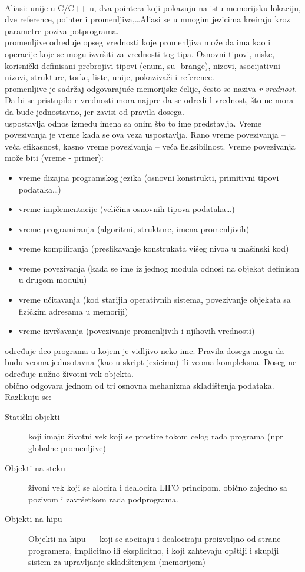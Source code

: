 \documentclass[../main.tex]{subfiles}
\begin{document}
\\ Aliasi: unije u C/C++-u, dva pointera koji pokazuju na istu memorijsku lokaciju, dve reference, pointer i promenljiva,\ldots Aliasi se u mnogim jezicima kreiraju kroz parametre poziva potprograma.
\\
 promenljive određuje opseg vrednosti koje promenljiva može da ima kao i operacije koje se mogu izvršiti za vrednosti tog tipa. Osnovni tipovi, niske, korisnički definisani prebrojivi tipovi (enum, su-
brange), nizovi, asocijativni nizovi, strukture, torke, liste, unije, pokazivači i reference.
\\
 promenljive je sadržaj odgovarajuće memorijske ćelije, često se naziva {\it r-vrednost}. Da bi se pristupilo r-vrednosti mora najpre da se odredi l-vrednost, što ne mora da bude jednostavno, jer zavisi od pravila dosega.
\\
 uspostavlja odnos izmedu imena sa onim što to ime predstavlja. Vreme povezivanja je vreme kada se ova veza uspostavlja. Rano vreme povezivanja -- veća efikasnost, kasno vreme povezivanja -- veća fleksibilnost. Vreme povezivanja može biti (vreme - primer):
\begin{itemize}
\item vreme dizajna programskog jezika (osnovni konstrukti, primitivni tipovi podataka\ldots)
\item vreme implementacije (veličina osnovnih tipova podataka\ldots)
\item vreme programiranja (algoritmi, strukture, imena promenljivih)
\item vreme kompiliranja (preslikavanje konstrukata višeg nivoa u mašinski kod)
\item vreme povezivanja (kada se ime iz jednog modula odnosi na objekat definisan u drugom modulu)
\item vreme učitavanja (kod starijih operativnih sistema, povezivanje objekata sa fizičkim adresama u memoriji)
\item vreme izvršavanja (povezivanje promenljivih i njihovih vrednosti)
\end{itemize}

 određuje deo programa u kojem je vidljivo neko ime. Pravila dosega mogu da budu veoma jednsotavna (kao u skript jezicima) ili veoma kompleksna. Doseg ne određuje nužno životni vek objekta. 
\\
 obično odgovara jednom od tri osnovna mehanizma skladištenja podataka. Razlikuju se:
\begin{description}
\item[Statički objekti] koji imaju životni vek koji se prostire tokom celog rada programa (npr globalne promenljive)
\item[Objekti na steku] živoni vek koji se alocira i dealocira LIFO principom, obično zajedno sa pozivom i završetkom rada podprograma.
\item[Objekti na hipu] Objekti na hipu — koji se aociraju i dealociraju proizvoljno od strane programera, implicitno ili eksplicitno, i koji zahtevaju opštiji i skuplji sistem za upravljanje skladištenjem (memorijom)
\end{description}
\end{document}
